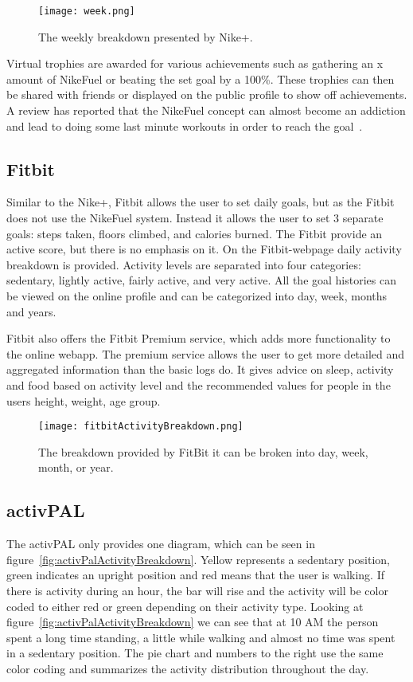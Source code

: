 \begin{figure}[h!]
	\centering
		\texttt{[image: week.png]}
		\caption{\footnotesize The weekly breakdown presented by Nike+. \cite{fuelbandTechSpce}}
		\label{fig:activityBreakdown}
\end{figure}

Virtual trophies are awarded for various achievements such as gathering an x amount of NikeFuel or beating the set goal by a 100\%. These trophies can then be shared with friends or displayed on the public profile to show off achievements. A review has reported that the NikeFuel concept can almost become an addiction and lead to doing some last minute workouts in order to reach the goal~\cite{fuelbandDcRain}.

\subsection{Fitbit}
Similar to the Nike+, Fitbit \cite{fitBit} allows the user to set daily goals, but as the Fitbit does not use the NikeFuel system. Instead it allows the user to set 3 separate goals: steps taken, floors climbed, and calories burned. The Fitbit provide an active score, but there is no emphasis on it. On the Fitbit-webpage daily activity breakdown is provided. Activity levels are separated into four categories: sedentary, lightly active, fairly active, and very active. All the goal histories can be viewed on the online profile and can be categorized into day, week, months and years. 

Fitbit also offers the Fitbit Premium service, which adds more functionality to the online webapp. The premium service allows the user to get more detailed and aggregated information than the basic logs do. It gives advice on sleep, activity and food based on activity level and the recommended values for people in the users height, weight, age group.

\begin{figure}[h!]
	\centering
		\texttt{[image: fitbitActivityBreakdown.png]}
		\caption{\footnotesize The breakdown provided by FitBit it can be broken into day, week, month, or year.}
		\label{fig:fitbitActivityBreakdown}
\end{figure}

\subsection{activPAL}
The activPAL only provides one diagram, which can be seen in figure~\ref{fig:activPalActivityBreakdown}. Yellow represents a sedentary position, green indicates an upright position and red means that the user is walking. If there is activity during an hour, the bar will rise and the activity will be color coded to either red or green depending on their activity type. Looking at figure~\ref{fig:activPalActivityBreakdown} we can see that at 10 AM the person spent a long time standing, a little while walking and almost no time was spent in a sedentary position. The pie chart and numbers to the right use the same color coding and summarizes the activity distribution throughout the day.

